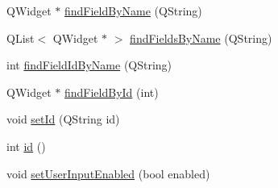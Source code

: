 \begin{DoxyCompactItemize}
\item 
QWidget $\ast$ \hyperlink{classFglForm_a7490b2d18830368110a69983f19d65cf}{findFieldByName} (QString)
\item 
QList$<$ QWidget $\ast$ $>$ \hyperlink{classFglForm_aa9bed6529e8937fdf1ebed65ca23cc45}{findFieldsByName} (QString)
\item 
int \hyperlink{classFglForm_a4d506d1f05b8ac540fe33dfa1524d681}{findFieldIdByName} (QString)
\item 
QWidget $\ast$ \hyperlink{classFglForm_a997cd55b341e14c89fdc300efe75b907}{findFieldById} (int)
\item 
void \hyperlink{classFglForm_a7010467be800cf868884b589f8ce8ce7}{setId} (QString id)
\item 
int \hyperlink{classFglForm_a4fc9bc745910f209c6f54f509293bd73}{id} ()
\item 
void \hyperlink{classFglForm_a47d0bbf071cbf0051b72c44a90062f81}{setUserInputEnabled} (bool enabled)
\end{DoxyCompactItemize}
